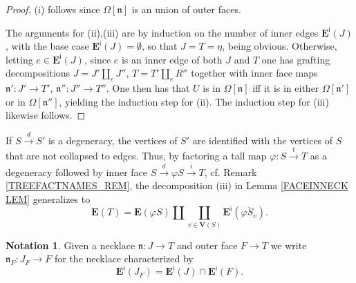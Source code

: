 \documentclass{hha}
\theoremstyle{definition} %
\newtheorem{notation}[theorem]{Notation}%
\begin{document}
\begin{proof}
	(i) follows since $\Omega[\mathfrak{n}]$ is an union of outer faces.
	
	The arguments for (ii),(iii) are by induction on the number of inner edges $\boldsymbol{E}^{\mathsf{i}}(J)$,
	with the base case $\boldsymbol{E}^{\mathsf{i}}(J) = \emptyset$,
	so that $J=T=\eta$,
	being obvious.
%	
	Otherwise, letting $e \in \boldsymbol{E}^{\mathsf{i}}(J)$, since $e$ is an inner edge of
	both $J$ and $T$
	one has grafting decompositions
	$J = J' \amalg_e J''$,
	$T = T' \amalg_e R''$
	together with inner face maps
	$\mathfrak{n}' \colon J' \to T'$,
	$\mathfrak{n}'' \colon J'' \to T''$.
%
	One then has that 
	$U$ is in $\Omega[\mathfrak{n}]$
	iff it is in either
	$\Omega[\mathfrak{n}']$ or in $\Omega[\mathfrak{n}'']$,
	yielding the induction step for (ii).
	The induction step for (iii) likewise follows. 
\end{proof}



\begin{remark}
	If $S \xrightarrow{d} S'$
	is a degeneracy,
	the vertices of $S'$ are identified with
	the vertices of $S$ that are not collapsed to edges.
	Thus, by factoring a tall map
	$\varphi \colon S \xrightarrow{t} T$ as
	a degeneracy followed by inner face
	$S \xrightarrow{d} \varphi S \xrightarrow{i} T$,
	cf. Remark \ref{TREEFACTNAMES_REM},
	the decomposition (iii) in Lemma \ref{FACEINNECK LEM}
	generalizes to 
\begin{equation}\label{EDGEBREAK EQ}
	\boldsymbol{E}(T) = 
	\boldsymbol{E}(\varphi S) \amalg 
	\coprod_{v \in \boldsymbol{V}(S)}
	\boldsymbol{E}^{\mathsf{i}}(\overline{\varphi S_v}).
\end{equation}
\end{remark}



\begin{notation}\label{JFNOT NOT}
	Given a necklace
	$\mathfrak{n} \colon J \to T$
	and outer face $F \to T$
	we write 
	$\mathfrak{n}_F \colon J_F \to F$
	for the necklace characterized by
\[
	\boldsymbol{E}^{\mathsf{i}}(J_F)
	=
	\boldsymbol{E}^{\mathsf{i}}(J)
	\cap
	\boldsymbol{E}^{\mathsf{i}}(F).
\]
\end{notation}
\end{document}
